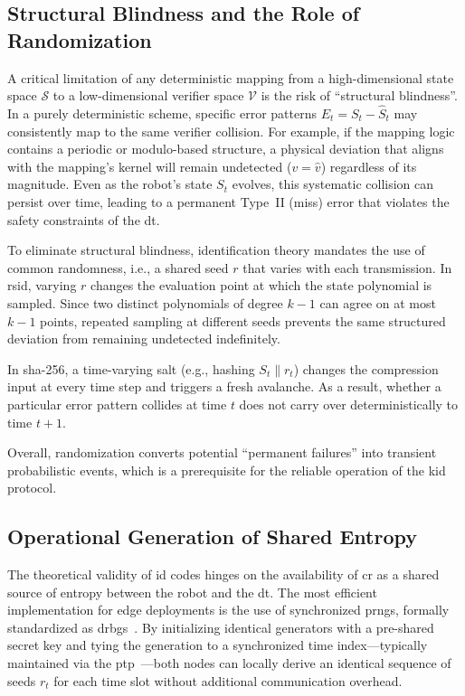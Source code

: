 \subsection{Structural Blindness and the Role of Randomization}
\label{subsec:structural_blindness}

A critical limitation of any deterministic mapping from a high-dimensional state space $\mathcal{S}$ to a low-dimensional verifier space $\mathcal{V}$ is the risk of \enquote{structural blindness}. In a purely deterministic scheme, specific error patterns $E_t = S_t - \hat{S}_t$ may consistently map to the same verifier collision. For example, if the mapping logic contains a periodic or modulo-based structure, a physical deviation that aligns with the mapping's kernel will remain undetected ($v = \hat{v}$) regardless of its magnitude. Even as the robot's state $S_t$ evolves, this systematic collision can persist over time, leading to a permanent Type~II (miss) error that violates the safety constraints of the \gls{dt}.



To eliminate structural blindness, identification theory mandates the use of common randomness, i.e., a shared seed $r$ that varies with each transmission. In \gls{rsid}, varying $r$ changes the evaluation point at which the state polynomial is sampled. Since two distinct polynomials of degree $k-1$ can agree on at most $k-1$ points, repeated sampling at different seeds prevents the same structured deviation from remaining undetected indefinitely.

In \gls{sha}-256, a time-varying salt (e.g., hashing $S_t \parallel r_t$) changes the compression input at every time step and triggers a fresh avalanche. As a result, whether a particular error pattern collides at time $t$ does not carry over deterministically to time $t+1$.

Overall, randomization converts potential \enquote{permanent failures} into transient probabilistic events, which is a prerequisite for the reliable operation of the \gls{kid} protocol.

\subsection{Operational Generation of Shared Entropy}
\label{subsec:cr_generation}

The theoretical validity of \gls{id} codes hinges on the availability of \gls{cr} as a shared source of entropy between the robot and the \gls{dt}. The most efficient implementation for edge deployments is the use of synchronized \glspl{prng}, formally standardized as \glspl{drbg}~\cite{nist80090a}. By initializing identical generators with a pre-shared secret key and tying the generation to a synchronized time index—typically maintained via the \gls{ptp}~\cite{ieee1588}—both nodes can locally derive an identical sequence of seeds $r_t$ for each time slot without additional communication overhead.

